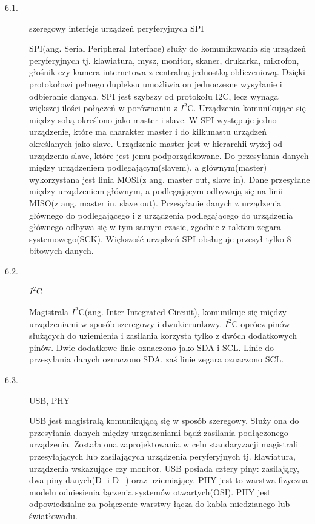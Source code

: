 \documentclass[12p]{article}
\begin{document}
\begin{description}
\item [6.1. ]szeregowy interfejs urządzeń peryferyjnych SPI

\quad SPI(ang. Serial Peripheral Interface) służy do komunikowania się urządzeń peryferyjnych tj. klawiatura, mysz, monitor, skaner, drukarka, mikrofon, głośnik czy kamera internetowa z centralną jednostką obliczeniową. Dzięki protokołowi pełnego dupleksu umożliwia on jednoczesne wysyłanie i odbieranie danych. SPI jest szybszy od protokołu I2C, lecz wynaga większej ilości połączeń w porównaniu z $I^{2}$C. Urządzenia komunikujące się między sobą określono jako master i slave. W SPI występuje jedno urządzenie, które ma charakter master i do kilkunastu urządzeń określanych jako slave. Urządzenie master jest w hierarchii wyżej od urządzenia slave, które jest jemu podporządkowane. Do przesyłania danych między urządzeniem  podlegającym(slavem), a głównym(master) wykorzystana jest linia MOSI(z ang. master out, slave in). Dane przesyłane między urządzeniem głównym, a podlegającym odbywają się na linii MISO(z ang. master in, slave out). Przesyłanie danych z urządzenia głównego do podlegającego i z urządzenia podlegającego do urządzenia głównego odbywa się w tym samym czasie, zgodnie z taktem zegara systemowego(SCK). Większość urządzeń SPI obsługuje przesył tylko 8 bitowych danych.

\item [6.2. ]$I^{2}$C

\quad Magistrala $I^{2}$C(ang. Inter-Integrated Circuit), komunikuje się między urządzeniami w sposób szeregowy i dwukierunkowy. $I^{2}$C oprócz pinów służących do uziemienia i zasilania korzysta tylko z dwóch dodatkowych pinów. Dwie dodatkowe linie oznaczono jako SDA i SCL. Linie do przesyłania danych oznaczono SDA, zaś linie zegara oznaczono SCL.

\item [6.3. ]USB, PHY

\quad USB jest magistralą komunikującą się w sposób szeregowy. Służy ona do przesyłania danych między urządzeniami bądź zasilania podłączonego urządzenia. Została ona zaprojektowania w celu standaryzacji magistrali przesyłających lub zasilających urządzenia peryferyjnych tj. klawiatura, urządzenia wskazujące czy monitor. USB posiada cztery piny: zasilający, dwa piny danych(D- i D+) oraz uziemiający. PHY jest to warstwa fizyczna modelu odniesienia łączenia systemów otwartych(OSI). PHY jest odpowiedzialne za połączenie warstwy łącza do kabla miedzianego lub światłowodu.

\end{description}
\newpage
\end{document}
